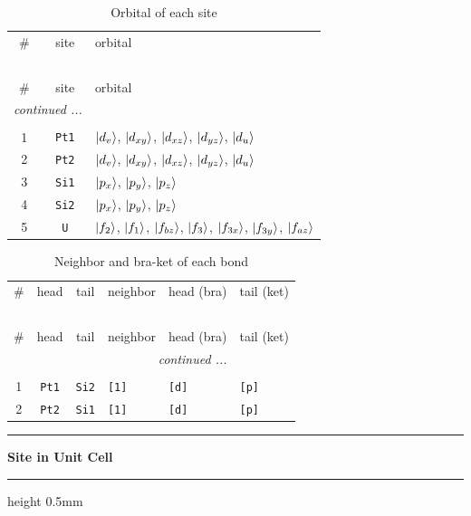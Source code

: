 \documentclass[fleqn,10pt,landscape]{jsarticle}
\begin{document}
\renewcommand{\arraystretch}{1.6}
\begin{longtable}[l]{ccl}
\captionsetup{justification=raggedright, singlelinecheck=off}
\caption{Orbital of each site}
 \\
 \hline \hline
\# & site & orbital \\ \hline \endfirsthead

\multicolumn{2}{l}{\tablename\ \thetable{}} \\
 \hline \hline
\# & site & orbital \\ \hline \endhead

 \hline \hline
\multicolumn{2}{r}{\footnotesize\it continued ...} \\ \endfoot

 \hline \hline
\multicolumn{2}{r}{} \\ \endlastfoot

1 & \texttt{Pt1} & $\ket{d_{v}}$, $\ket{d_{xy}}$, $\ket{d_{xz}}$, $\ket{d_{yz}}$, $\ket{d_{u}}$ \\ \hline
2 & \texttt{Pt2} & $\ket{d_{v}}$, $\ket{d_{xy}}$, $\ket{d_{xz}}$, $\ket{d_{yz}}$, $\ket{d_{u}}$ \\ \hline
3 & \texttt{Si1} & $\ket{p_{x}}$, $\ket{p_{y}}$, $\ket{p_{z}}$ \\ \hline
4 & \texttt{Si2} & $\ket{p_{x}}$, $\ket{p_{y}}$, $\ket{p_{z}}$ \\ \hline
5 & \texttt{U} & $\ket{f_{2}}$, $\ket{f_{1}}$, $\ket{f_{bz}}$, $\ket{f_{3}}$, $\ket{f_{3x}}$, $\ket{f_{3y}}$, $\ket{f_{az}}$ \\
\end{longtable}
\renewcommand{\arraystretch}{1.6}
\begin{longtable}[l]{ccclll}
\captionsetup{justification=raggedright, singlelinecheck=off}
\caption{Neighbor and bra-ket of each bond}
 \\
 \hline \hline
\# & head & tail & neighbor & head (bra) & tail (ket) \\ \hline \endfirsthead

\multicolumn{5}{l}{\tablename\ \thetable{}} \\
 \hline \hline
\# & head & tail & neighbor & head (bra) & tail (ket) \\ \hline \endhead

 \hline \hline
\multicolumn{5}{r}{\footnotesize\it continued ...} \\ \endfoot

 \hline \hline
\multicolumn{5}{r}{} \\ \endlastfoot

1 & \texttt{Pt1} & \texttt{Si2} & \texttt{[1]} & \texttt{[d]} & \texttt{[p]} \\ \hline
2 & \texttt{Pt2} & \texttt{Si1} & \texttt{[1]} & \texttt{[d]} & \texttt{[p]} \\
\end{longtable}
\vspace{5mm}
\noindent \rule[0.5mm]{5mm}{0.5mm}\hspace{3mm}\textbf{Site in Unit Cell}\hspace{3mm}\leaders\hrule height 0.5mm\hfill\kern0pt
\vspace{3mm}
\end{document}
